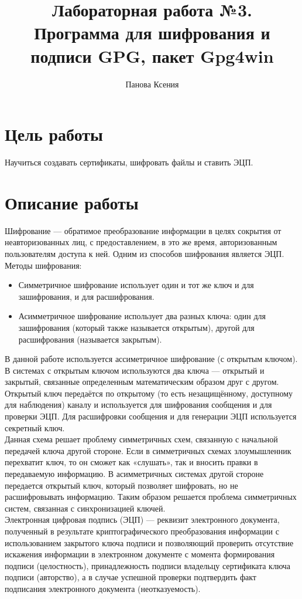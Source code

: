 \documentclass[10pt,a4paper]{report}
\author{Панова Ксения}
\title{Лабораторная работа №3.\\
	Программа для шифрования и подписи GPG, пакет Gpg4win}
\begin{document}
\maketitle
\tableofcontents
\pagebreak

\section{Цель работы}
Научиться создавать сертификаты, шифровать файлы и ставить ЭЦП.
\section{Описание работы}
Шифрование — обратимое преобразование информации в целях сокрытия от неавторизованных лиц, с предоставлением, в это же время, авторизованным пользователям доступа к ней. Одним из способов шифрования является ЭЦП.\\
Методы шифрования:
\begin{itemize}
\item Симметричное шифрование использует один и тот же ключ и для зашифрования, и для расшифрования.
\item Асимметричное шифрование использует два разных ключа: один для зашифрования (который также называется открытым), другой для расшифрования (называется закрытым).
\end{itemize}
В данной работе используется ассиметричное шифрование (с открытым ключом).\\
В системах с открытым ключом используются два ключа — открытый и закрытый, связанные определенным математическим образом друг с другом. Открытый ключ передаётся по открытому (то есть незащищённому, доступному для наблюдения) каналу и используется для шифрования сообщения и для проверки ЭЦП. Для расшифровки сообщения и для генерации ЭЦП используется секретный ключ.\\
Данная схема решает проблему симметричных схем, связанную с начальной передачей ключа другой стороне. Если в симметричных схемах злоумышленник перехватит ключ, то он сможет как «слушать», так и вносить правки в передаваемую информацию. В асимметричных системах другой стороне передается открытый ключ, который позволяет шифровать, но не расшифровывать информацию. Таким образом решается проблема симметричных систем, связанная с синхронизацией ключей.\\
Электронная цифровая подпись (ЭЦП) — реквизит электронного документа, полученный в результате криптографического преобразования информации с использованием закрытого ключа подписи и позволяющий проверить отсутствие искажения информации в электронном документе с момента формирования подписи (целостность), принадлежность подписи владельцу сертификата ключа подписи (авторство), а в случае успешной проверки подтвердить факт подписания электронного документа (неотказуемость).  \\
\end{document}
